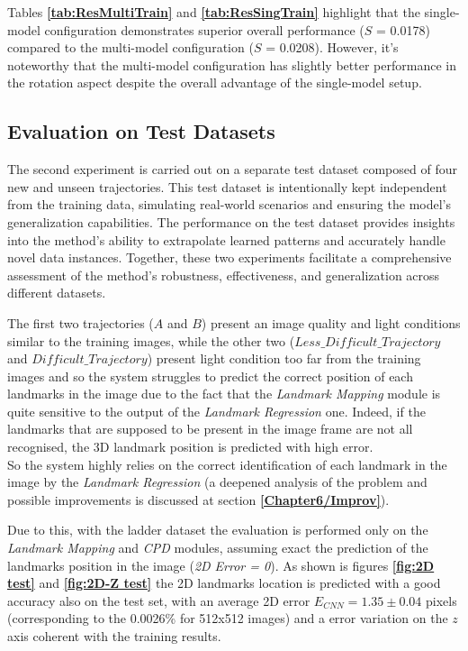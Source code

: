 \newpage
Tables \textbf{\ref{tab:ResMultiTrain}} and \textbf{\ref{tab:ResSingTrain}} highlight that the single-model configuration demonstrates superior overall performance ($S$ = 0.0178) compared to the multi-model configuration ($S$ = 0.0208). However, it's noteworthy that the multi-model configuration has slightly better performance in the rotation aspect despite the overall advantage of the single-model setup.

\subsection{Evaluation on Test Datasets}
\label{Chapter5/EvalTest}
The second experiment is carried out on a separate test dataset composed of four new and unseen trajectories. This test dataset is intentionally kept independent from the training data, simulating real-world scenarios and ensuring the model's generalization capabilities. The performance on the test dataset provides insights into the method's ability to extrapolate learned patterns and accurately handle novel data instances. Together, these two experiments facilitate a comprehensive assessment of the method's robustness, effectiveness, and generalization across different datasets.

The first two trajectories ($A$ and $B$) present an image quality and light conditions similar to the training images, while the other two ($Less\_Difficult\_Trajectory$ and $Difficult\_Trajectory$) present light condition too far from the training images and so the system struggles to predict the correct position of each landmarks in the image due to the fact that the \textit{Landmark Mapping} module is quite sensitive to the output of the \textit{Landmark Regression} one. Indeed, if the landmarks that are supposed to be present in the image frame are not all recognised, the 3D landmark position is predicted with high error.\\
So the system highly relies on the correct identification of each landmark in the image by the \textit{Landmark Regression} (a deepened analysis of the problem and possible improvements is discussed at section \textbf{\ref{Chapter6/Improv}}). 

Due to this, with the ladder dataset the evaluation is performed only on the \textit{Landmark Mapping} and \textit{CPD} modules, assuming exact the prediction of the landmarks position in the image (\textit{2D Error = 0}).
\newpage
As shown is figures \textbf{\ref{fig:2D test}} and \textbf{\ref{fig:2D-Z test}} the 2D landmarks location is predicted with a good accuracy also on the test set, with an average 2D error $E_{CNN} = 1.35 \pm 0.04$ pixels (corresponding to the 0.0026\% for 512x512 images) and a error variation on the $z$ axis coherent with the training results. 

